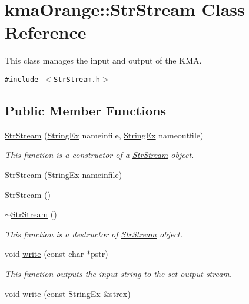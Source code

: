 \hypertarget{classkmaOrange_1_1StrStream}{
\section{kmaOrange::StrStream Class Reference}
\label{classkmaOrange_1_1StrStream}
}
This class manages the input and output of the KMA.  


{\tt \#include $<$StrStream.h$>$}

\subsection*{Public Member Functions}
\begin{CompactItemize}
\item 
\hyperlink{classkmaOrange_1_1StrStream_1298b43a81e72deebca46f146dad02e8}{StrStream} (\hyperlink{classStringEx}{StringEx} nameinfile, \hyperlink{classStringEx}{StringEx} nameoutfile)
\begin{CompactList}\small\item\em This function is a constructor of a \hyperlink{classkmaOrange_1_1StrStream}{StrStream} object. \item\end{CompactList}\item 
\hyperlink{classkmaOrange_1_1StrStream_43671c7f0630f630c346e61df2e8ec5b}{StrStream} (\hyperlink{classStringEx}{StringEx} nameinfile)
\item 
\hyperlink{classkmaOrange_1_1StrStream_f828ced82d9272444be6bcfc60b33fd5}{StrStream} ()
\item 
\hyperlink{classkmaOrange_1_1StrStream_49071b602f5e14265b81c2280c8c56de}{$\sim$StrStream} ()
\begin{CompactList}\small\item\em This function is a destructor of \hyperlink{classkmaOrange_1_1StrStream}{StrStream} object. \item\end{CompactList}\item 
void \hyperlink{classkmaOrange_1_1StrStream_0edd64d2f685a6009bf551b3599cb151}{write} (const char $\ast$pstr)
\begin{CompactList}\small\item\em This function outputs the input string to the set output stream. \item\end{CompactList}\item 
void \hyperlink{classkmaOrange_1_1StrStream_c466e1f8494ee24b4cfe7e24ef20682e}{write} (const \hyperlink{classStringEx}{StringEx} \&strex)

\end{CompactItemize}
